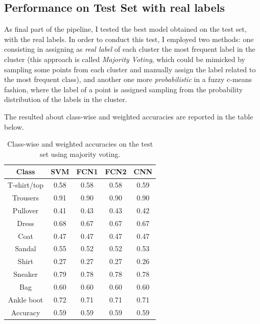 \documentclass[a4paper, 10pt]{article}
\begin{document}
\subsection{Performance on Test Set with real labels}
As final part of the pipeline, I tested the best model obtained on the test set, with the real labels. In order to conduct this test, I employed two methods: one
consisting in assigning as \textit{real label} of each cluster the most frequent label in the cluster (this approach is called \textit{Majority Voting}, which
could be mimicked by sampling some points from each cluster and manually assign the label related to the most frequent class), and another one more \textit{probabilistic} in
a fuzzy c-means fashion, where the label of a point is assigned sampling from the probability distribution of the labels in the cluster.

The resulted about class-wise and weighted accuracies are reported in the table below.
\begin{table}[ht]
    \centering
    \begin{tabular}{|c|c|c|c|c|}
        \hline
        \textbf{Class} & \textbf{SVM} & \textbf{FCN1} & \textbf{FCN2} & \textbf{CNN} \\
        \hline
        \hline
        T-shirt/top & 0.58 & 0.58 & 0.58 & 0.59 \\
        Trousers    & 0.91 & 0.90 & 0.90 & 0.90 \\
        Pullover    & 0.41 & 0.43 & 0.43 & 0.42 \\
        Dress       & 0.68 & 0.67 & 0.67 & 0.67 \\
        Coat        & 0.47 & 0.47 & 0.47 & 0.47 \\
        Sandal      & 0.55 & 0.52 & 0.52 & 0.53 \\
        Shirt       & 0.27 & 0.27 & 0.27 & 0.26 \\
        Sneaker     & 0.79 & 0.78 & 0.78 & 0.78 \\
        Bag         & 0.60 & 0.60 & 0.60 & 0.60 \\
        Ankle boot  & 0.72 & 0.71 & 0.71 & 0.71 \\
        \hline
        Accuracy    & 0.59 & 0.59 & 0.59 & 0.59 \\
        \hline
    \end{tabular}
    \caption{Class-wise and weighted accuracies on the test set using majority voting.}
    \label{tab:majority}
\end{table}
\end{document}
